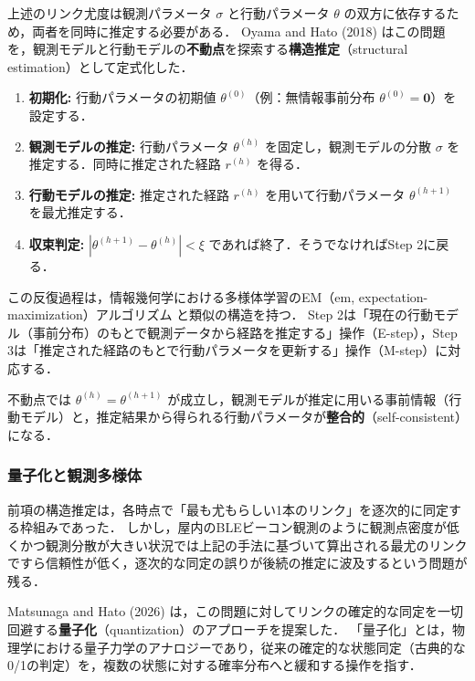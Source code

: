 上述のリンク尤度は観測パラメータ $\sigma$ と行動パラメータ $\theta$ の双方に依存するため，両者を同時に推定する必要がある．
Oyama and Hato (2018) \cite{Oyama2018gpseng} はこの問題を，観測モデルと行動モデルの\textbf{不動点}を探索する\textbf{構造推定}（structural estimation）として定式化した．

\begin{enumerate}
  \item \textbf{初期化:} 行動パラメータの初期値 $\theta^{(0)}$（例：無情報事前分布 $\theta^{(0)} = \bm{0}$）を設定する．
  \item \textbf{観測モデルの推定:} 行動パラメータ $\theta^{(h)}$ を固定し，観測モデルの分散 $\sigma$ を推定する．同時に推定された経路 $r^{(h)}$ を得る．
  \item \textbf{行動モデルの推定:} 推定された経路 $r^{(h)}$ を用いて行動パラメータ $\theta^{(h+1)}$ を最尤推定する．
  \item \textbf{収束判定:} $|\theta^{(h+1)} - \theta^{(h)}| < \xi$ であれば終了．そうでなければStep 2に戻る．
\end{enumerate}

この反復過程は，情報幾何学における多様体学習のEM（em, expectation-maximization）アルゴリズム \cite{Amari1995} と類似の構造を持つ．
Step 2は「現在の行動モデル（事前分布）のもとで観測データから経路を推定する」操作（E-step），Step 3は「推定された経路のもとで行動パラメータを更新する」操作（M-step）に対応する．

不動点では $\theta^{(h)} = \theta^{(h+1)}$ が成立し，観測モデルが推定に用いる事前情報（行動モデル）と，推定結果から得られる行動パラメータが\textbf{整合的}（self-consistent）になる．

\subsubsection{量子化と観測多様体}\label{sssec:quantization}
前項の構造推定は，各時点で「最も尤もらしい1本のリンク」を逐次的に同定する枠組みであった．
しかし，屋内のBLEビーコン観測のように観測点密度が低くかつ観測分散が大きい状況では上記の手法に基づいて算出される最尤のリンクですら信頼性が低く，逐次的な同定の誤りが後続の推定に波及するという問題が残る．

Matsunaga and Hato (2026) \cite{matsunaga2026trc} は，この問題に対してリンクの確定的な同定を一切回避する\textbf{量子化}（quantization）のアプローチを提案した．
「量子化」とは，物理学における量子力学のアナロジーであり，従来の確定的な状態同定（古典的な0/1の判定）を，複数の状態に対する確率分布へと緩和する操作を指す．

